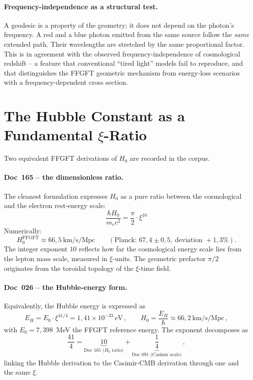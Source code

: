 \documentclass[11pt,a4paper]{article}
\begin{document}
\paragraph{Frequency-independence as a structural test.}
A geodesic is a property of the geometry; it does not depend on the photon's frequency. A red and a blue photon emitted from the same source follow the \emph{same} extended path. Their wavelengths are stretched by the same proportional factor. This is in agreement with the observed frequency-independence of cosmological redshift -- a feature that conventional ``tired light'' models fail to reproduce, and that distinguishes the FFGFT geometric mechanism from energy-loss scenarios with a frequency-dependent cross section.

\section{The Hubble Constant as a Fundamental \texorpdfstring{$\xi$}{xi}-Ratio}

Two equivalent FFGFT derivations of $H_0$ are recorded in the corpus.

\paragraph{Doc~165 -- the dimensionless ratio.} The cleanest formulation expresses $H_0$ as a pure ratio between the cosmological and the electron rest-energy scale:
\begin{equation}
\boxed{\;\frac{\hbar H_0}{m_e c^2} = \frac{\pi}{2}\cdot\xi^{10}\;}
\label{eq:h0_ratio}
\end{equation}
Numerically:
\begin{equation}
H_0^{\mathrm{FFGFT}} \approx 66{,}5\ \text{km/s/Mpc} \qquad (\text{Planck: } 67{,}4 \pm 0{,}5,\ \text{deviation } +1{,}3\%).
\end{equation}
The integer exponent $10$ reflects how far the cosmological energy scale lies from the lepton mass scale, measured in $\xi$-units. The geometric prefactor $\pi/2$ originates from the toroidal topology of the $\xi$-time field.

\paragraph{Doc~026 -- the Hubble-energy form.} Equivalently, the Hubble energy is expressed as
\begin{equation}
E_H = E_0\cdot\xi^{41/4} = 1{,}41\times 10^{-33}\,\text{eV}\,, \qquad H_0 = \frac{E_H}{\hbar} \approx 66{,}2\ \text{km/s/Mpc}\,,
\label{eq:EH_026}
\end{equation}
with $E_0 = 7{,}398$~MeV the FFGFT reference energy. The exponent decomposes as
\begin{equation}
\frac{41}{4} = \underbrace{10}_{\text{Doc 165 (}H_0\text{ ratio)}} + \underbrace{\frac{1}{4}}_{\text{Doc 091 (Casimir scale)}}\,,
\end{equation}
linking the Hubble derivation to the Casimir-CMB derivation through one and the same $\xi$.
\end{document}
